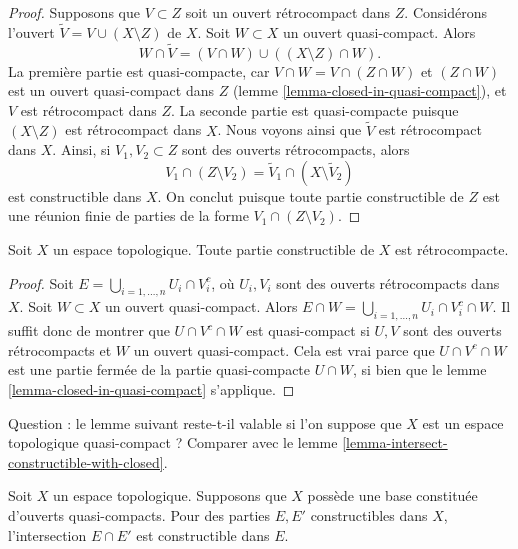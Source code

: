 \begin{proof}
Supposons que $V \subset Z$ soit un ouvert rétrocompact dans $Z$. Considérons l'ouvert
$\tilde V = V \cup (X \setminus Z)$ de $X$. Soit $W \subset X$ un
ouvert quasi-compact. Alors
$$
W \cap \tilde V =
\left(V \cap W\right) \cup \left((X \setminus Z) \cap W\right).
$$
La première partie est quasi-compacte, car $V \cap W = V \cap (Z \cap W)$ et
$(Z \cap W)$ est un ouvert quasi-compact dans $Z$
(lemme \ref{lemma-closed-in-quasi-compact}), et $V$ est rétrocompact dans $Z$.
La seconde partie est quasi-compacte puisque $(X \setminus Z)$ est rétrocompact dans $X$.
Nous voyons ainsi que $\tilde V$ est rétrocompact dans $X$.
Ainsi, si $V_1, V_2 \subset Z$ sont des ouverts rétrocompacts, alors
$$
V_1 \cap (Z \setminus V_2) = \tilde V_1 \cap (X \setminus \tilde V_2)
$$
est constructible dans $X$. On conclut puisque toute partie constructible de $Z$
est une réunion finie de parties de la forme $V_1 \cap (Z \setminus V_2)$.
\end{proof}

\begin{lemma}
\label{lemma-constructible-is-retrocompact}
Soit $X$ un espace topologique. Toute partie constructible
de $X$ est rétrocompacte.
\end{lemma}

\begin{proof}
Soit $E = \bigcup_{i = 1, \ldots, n} U_i \cap V_i^c$, où $U_i, V_i$ sont des
ouverts rétrocompacts dans $X$. Soit $W \subset X$ un ouvert quasi-compact.
Alors $E \cap W = \bigcup_{i = 1, \ldots, n} U_i \cap V_i^c \cap W$.
Il suffit donc de montrer que $U \cap V^c \cap W$ est quasi-compact
si $U, V$ sont des ouverts rétrocompacts et $W$ un ouvert
quasi-compact. Cela est vrai parce que $U \cap V^c \cap W$ est une partie fermée
de la partie quasi-compacte $U \cap W$, si bien que le
lemme \ref{lemma-closed-in-quasi-compact}
s'applique.
\end{proof}

\noindent
Question : le lemme suivant reste-t-il valable si l'on suppose que $X$ est un
espace topologique quasi-compact ? Comparer avec le
lemme \ref{lemma-intersect-constructible-with-closed}.

\begin{lemma}
\label{lemma-intersect-constructible-with-constructible}
Soit $X$ un espace topologique. Supposons que
$X$ possède une base constituée d'ouverts quasi-compacts.
Pour des parties $E, E'$ constructibles dans $X$, l'intersection
$E \cap E'$ est constructible dans $E$.
\end{lemma}

